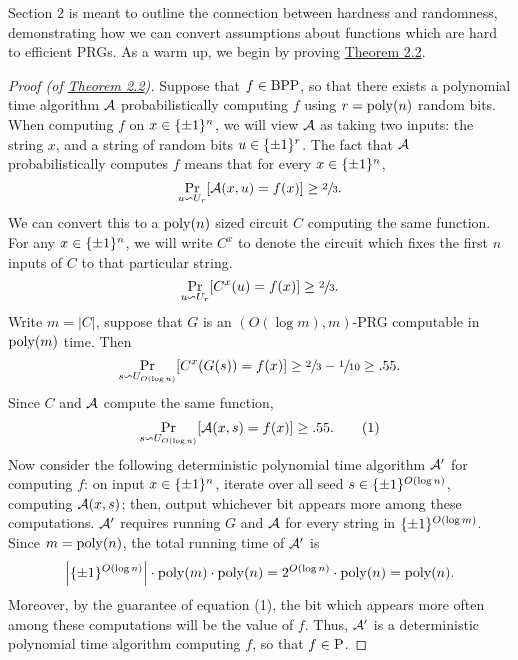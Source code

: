 \documentclass[11pt]{article}
\begin{document}
Section 2 is meant to outline the connection between hardness and randomness, demonstrating how we can convert assumptions about functions which are hard to efficient PRGs. As a warm up, we begin by proving \hyperref[t-2-2]{Theorem 2.2}.

\begin{proof}[Proof \textup{(of \hyperref[t-2-2]{Theorem 2.2})}] Suppose that $f \in \BPP$, so that there exists a polynomial time algorithm $\cA$ probabilistically computing $f$ using $r = \poly(n)$ random bits. When computing $f$ on $x \in \pmon$, we will view $\cA$ as taking two inputs: the string $x$, and a string of random bits $u \in \pmo^{r}$. The fact that $\cA$ probabilistically computes $f$ means that for every $x \in \pmon$, 
\begin{equation*}
    \Pr_{u \backsim U_r}[\cA(x, u) = f(x)] \geq \sfrac{2}{3}. 
\end{equation*}
We can convert this to a $\poly(n)$ sized circuit $C$ computing the same function. For any $x \in \pmon$, we will write $C^x$ to denote the circuit which fixes the first $n$ inputs of $C$ to that particular string.
\begin{equation*}
    \Pr_{u \backsim U_r}[C^{x}(u) = f(x)] \geq \sfrac{2}{3}. 
\end{equation*}
Write $m = |C|$, suppose that $G$ is an $(O(\log m), m)$-PRG computable in $\poly(m)$ time. Then 
\begin{equation*}
    \Pr_{s \backsim U_{O(\log n)}}[C^{x}(G(s)) = f(x)] \geq \sfrac{2}{3} - \sfrac{1}{10} \geq .55.
\end{equation*}
Since $C$ and $\cA$ compute the same function, 
\begin{equation*}
    \Pr_{s \backsim U_{O(\log n)}}[\cA(x, s) = f(x)] \geq  .55. \tag{1}
\end{equation*}
Now consider the following deterministic polynomial time algorithm $\cA'$ for computing $f$: on input $x \in \pmon$, iterate over all seed $s \in \pmo^{O(\log n)}$, computing $\cA(x, s)$; then, output whichever bit appears more among these computations. $\cA'$ requires running $G$ and $\cA$ for every string in $\pmo^{O(\log m)}$. Since $m = \poly(n)$, the total running time of $\cA'$ is 
\begin{equation*}
    \left|\pmo^{O(\log n)}\right| \cdot \poly(m) \cdot \poly(n) = 2^{O(\log n)} \cdot \poly(n) = \poly(n).
\end{equation*}
Moreover, by the guarantee of equation (1), the bit which appears more often among these computations will be the value of $f$. Thus, $\cA'$ is a deterministic polynomial time algorithm computing $f$, so that $f \in \P$.
\end{proof}
\end{document}
